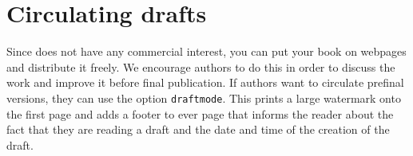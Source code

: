  
   
\section{Circulating drafts}

Since \lsp does not have any commercial interest, you can put your book on webpages and distribute it
freely. We encourage authors to do this in order to discuss the work and improve it before final
publication. If authors want to circulate prefinal versions, they can use the option
\texttt{draftmode}. This prints a large watermark onto the first page and adds a footer to ever page
that informs the reader about the fact that they are reading a draft and the date and time of the
creation of the draft.
  